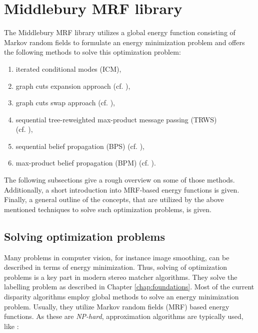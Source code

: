 \section{Middlebury MRF library}

The Middlebury MRF library \citep{scharstein2014high, szeliski2008comparative} utilizes a global energy function consisting of Markov random fields to formulate an energy minimization problem and offers the following methods to solve this optimization problem:

\begin{enumerate}
  \item iterated conditional modes (ICM),
  \item graph cuts expansion approach (cf. \citep{boykov2001fast, ramin2004energy, kolmogorov2004energy}),
  \item graph cuts swap approach (cf. \citep{boykov2001fast, ramin2004energy, kolmogorov2004energy}),
  \item sequential tree-reweighted max-product message passing (TRWS)\\(cf. \citep{kolmogorov2006convergent, wainwright2005map}),
  \item sequential belief propagation (BPS) (cf. \citep{boykov2001fast}),
  \item max-product belief propagation (BPM) (cf. \citep{boykov2001fast}).
\end{enumerate}

\noindent The following subsections give a rough overview on some of those methods.
Additionally, a short introduction into MRF-based energy functions is given.
Finally, a general outline of the concepts, that are utilized by the above mentioned techniques to solve such optimization problems, is given.

\subsection*{Solving optimization problems}

Many problems in computer vision, for instance image smoothing, can be described in terms of energy minimization.
Thus, solving of optimization problems is a key part in modern stereo matcher algorithms.
They solve the labelling problem as described in Chapter \ref{chap:foundations}.
Most of the current disparity algorithms employ global methods to solve an energy minimization problem.
Usually, they utilize Markov random fields (MRF) based energy functions.
As these are \textit{NP-hard}, approximation algorithms are typically used, like \citep{tappen2003comparison, cyganek2011introduction}:

